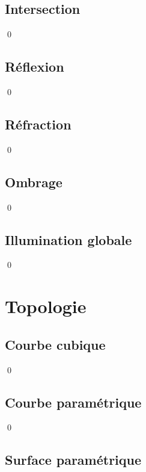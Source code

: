 \documentclass[12pt]{article}
\newcommand{\state}{\noindent}
\begin{document}
\subsection{Intersection}

\state

\qed

\subsection{Réflexion}

\state

\qed

\subsection{Réfraction}

\state

\qed

\subsection{Ombrage}

\state

\qed

\subsection{Illumination globale}

\state

\qed

\pagebreak

\section{Topologie}

\subsection{Courbe cubique}

\state

\qed

\subsection{Courbe paramétrique}

\state

\qed

\subsection{Surface paramétrique}
\end{document}
